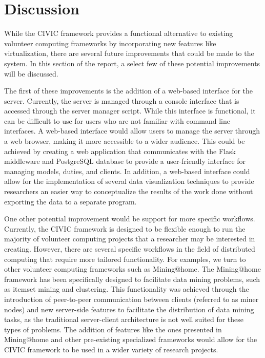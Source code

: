 \documentclass[11pt]{article}
\begin{document}
\section{Discussion}

While the CIVIC framework provides a functional alternative to existing volunteer computing frameworks by incorporating new features like virtualization, there are several future improvements that could be made to the system. In this section of the report, a select few of these potential improvements will be discussed. 

The first of these improvements is the addition of a web-based interface for the server. Currently, the server is managed through a console interface that is accessed through the server manager script. While this interface is functional, it can be difficult to use for users who are not familiar with command line interfaces. A web-based interface would allow users to manage the server through a web browser, making it more accessible to a wider audience. This could be achieved by creating a web application that communicates with the Flask middleware and PostgreSQL database to provide a user-friendly interface for managing models, duties, and clients. In addition, a web-based interface could allow for the implementation of several data visualization techniques to provide researchers an easier way to conceptualize the results of the work done without exporting the data to a separate program.

One other potential improvement would be support for more specific workflows. Currently, the CIVIC framework is designed to be flexible enough to run the majority of volunteer computing projects that a researcher may be interested in creating. However, there are several specific workflows in the field of distributed computing that require more tailored functionality. For examples, we turn to other volunteer computing frameworks such as Mining@home. The Mining@home framework has been specifically designed to facilitate data mining problems, such as itemset mining and clustering. This functionality was achieved through the introduction of peer-to-peer communication between clients (referred to as miner nodes) and new server-side features to facilitate the distribution of data mining tasks, as the traditional server-client architecture is not well suited for these types of problems. The addition of features like the ones presented in Mining@home and other pre-existing specialized frameworks would allow for the CIVIC framework to be used in a wider variety of research projects.
\end{document}
